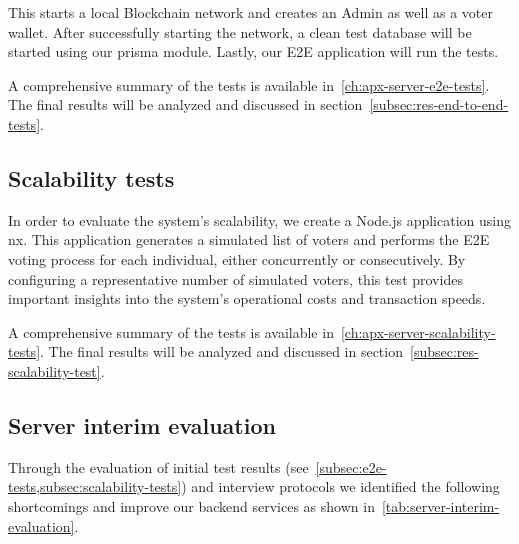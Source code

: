 This starts a local \gls{Blockchain} network and creates an \gls{Admin} as well as a voter wallet.
After successfully starting the network, a clean test database will be started using our prisma module.
Lastly, our \gls{E2E} application will run the tests.

A comprehensive summary of the tests is available in~\cref{ch:apx-server-e2e-tests}.
The final results will be analyzed and discussed in section~\cref{subsec:res-end-to-end-tests}.

\subsection{Scalability tests}\label{subsec:scalability-tests}

In order to evaluate the system's scalability, we create a Node.js application using nx.
This application generates a simulated list of voters and performs the \gls{E2E} voting process for each individual, either concurrently or consecutively.
By configuring a representative number of simulated voters, this test provides important insights into the system's operational costs and transaction speeds.

A comprehensive summary of the tests is available in~\cref{ch:apx-server-scalability-tests}.
The final results will be analyzed and discussed in section~\cref{subsec:res-scalability-test}.

\subsection{Server interim evaluation}\label{subsec:server-interim-evaluation}

Through the evaluation of initial test results (see~\cref{subsec:e2e-tests,subsec:scalability-tests}) and interview protocols we identified the following shortcomings and improve our backend services as shown in~\cref{tab:server-interim-evaluation}.

